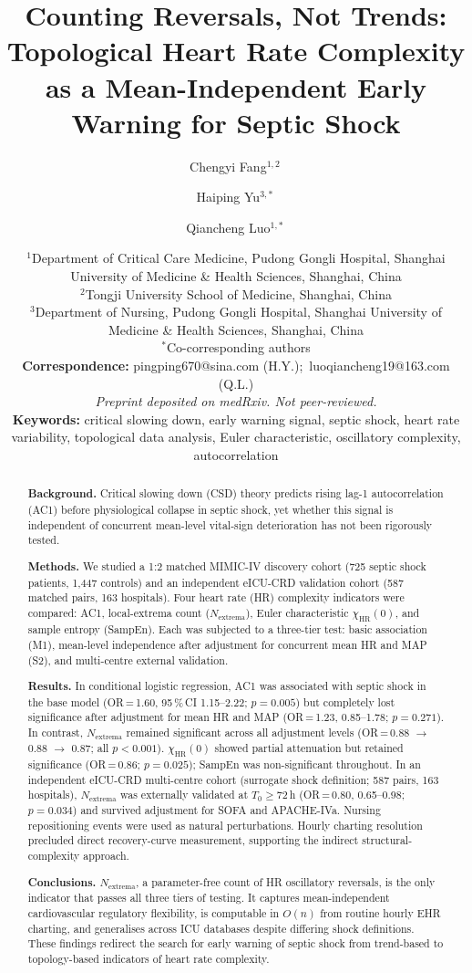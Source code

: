 \documentclass[12pt,a4paper]{article}
\title{\textbf{Counting Reversals, Not Trends: Topological Heart Rate
Complexity as a Mean-Independent Early Warning for Septic Shock}}
\author{
  Chengyi Fang$^{1,2}$\,\orcidlink{0009-0006-1237-7763} \and
  Haiping Yu$^{3,*}$\,\orcidlink{0000-0002-3394-2841} \and
  Qiancheng Luo$^{1,*}$\,\orcidlink{0000-0003-4054-5593}
}
\date{
  $^1$Department of Critical Care Medicine, Pudong Gongli Hospital,
       Shanghai University of Medicine \& Health Sciences, Shanghai, China \\
  $^2$Tongji University School of Medicine, Shanghai, China \\
  $^3$Department of Nursing, Pudong Gongli Hospital,
       Shanghai University of Medicine \& Health Sciences, Shanghai, China \\[6pt]
  $^*$Co-corresponding authors \\[6pt]
  \textbf{Correspondence:}
  pingping670@sina.com (H.Y.);\ luoqiancheng19@163.com (Q.L.) \\[6pt]
  \textit{Preprint deposited on medRxiv. Not peer-reviewed.} \\[4pt]
  \textbf{Keywords:} critical slowing down, early warning signal, septic shock,
  heart rate variability, topological data analysis, Euler characteristic,
  oscillatory complexity, autocorrelation
}
\begin{document}
\maketitle

\begin{abstract}

\noindent\textbf{Background.}
Critical slowing down (CSD) theory predicts rising lag-1 autocorrelation
(AC1) before physiological collapse in septic shock, yet whether this
signal is independent of concurrent mean-level vital-sign deterioration
has not been rigorously tested.

\noindent\textbf{Methods.}
We studied a 1:2 matched MIMIC-IV discovery cohort (725 septic shock
patients, 1,447 controls) and an independent eICU-CRD validation cohort
(587 matched pairs, 163 hospitals).
Four heart rate (HR) complexity indicators were compared: AC1,
local-extrema count ($N_{\text{extrema}}$), Euler characteristic
$\chi_{\text{HR}}(0)$, and sample entropy (SampEn).
Each was subjected to a three-tier test: basic association (M1),
mean-level independence after adjustment for concurrent mean HR and MAP (S2),
and multi-centre external validation.

\noindent\textbf{Results.}
In conditional logistic regression, AC1 was associated with septic shock
in the base model (OR\,=\,1.60, 95\,\%\,CI 1.15--2.22; $p=0.005$) but
completely lost significance after adjustment for mean HR and MAP
(OR\,=\,1.23, 0.85--1.78; $p=0.271$).
In contrast, $N_{\text{extrema}}$ remained significant
across all adjustment levels
(OR\,=\,0.88 $\to$ 0.88 $\to$ 0.87; all $p<0.001$).
$\chi_{\text{HR}}(0)$ showed partial attenuation but retained significance
(OR\,=\,0.86; $p=0.025$); SampEn was non-significant throughout.
In an independent eICU-CRD multi-centre cohort (surrogate shock definition;
587 pairs, 163 hospitals), $N_{\text{extrema}}$ was externally validated
at $T_0\geq 72$\,h (OR\,=\,0.80, 0.65--0.98; $p=0.034$) and survived
adjustment for SOFA and APACHE-IVa.
Nursing repositioning events were used as natural perturbations.
Hourly charting resolution precluded direct recovery-curve measurement,
supporting the indirect structural-complexity approach.

\noindent\textbf{Conclusions.}
$N_{\text{extrema}}$, a parameter-free count of HR oscillatory reversals, is
the only indicator that passes all three tiers of testing.
It captures mean-independent cardiovascular regulatory flexibility,
is computable in $O(n)$ from routine hourly EHR charting, and generalises
across ICU databases despite differing shock definitions.
These findings redirect the search for early warning of septic shock
from trend-based to topology-based indicators of heart rate complexity.

\end{abstract}
\end{document}
